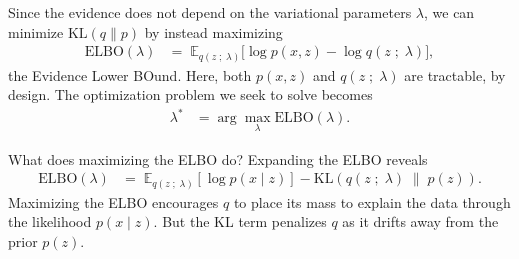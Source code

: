Since the evidence does not depend on the variational parameters $\lambda$,
we can minimize $\text{KL}(q\|p)$ by instead maximizing
\begin{align*}
  \text{ELBO}(\lambda)
  &=\;
  \mathbb{E}_{q(z\;;\;\lambda)}
  \big[
  \log p(x, z)
  -
  \log q(z\;;\;\lambda)
  \big],
\end{align*}
the Evidence Lower BOund. Here, both $p(x,z)$ and $q(z\;;\;\lambda)$ are
tractable, by design. The optimization problem we seek to solve becomes
\begin{align*}
  \lambda^*
  &=
  \arg \max_\lambda \text{ELBO}(\lambda).
\end{align*}

What does maximizing the ELBO do? Expanding the ELBO reveals
\begin{align*}
  \text{ELBO}(\lambda) 
  &=\;
  \mathbb{E}_{q(z \;;\; \lambda)}[\log p(x \mid z)]  
  - \text{KL}(q(z \;;\; \lambda) \;\|\; p(z)).
\end{align*}
Maximizing the ELBO encourages $q$ to place its mass to explain the data through
the likelihood $p(x \mid z)$. But the KL term penalizes $q$ as it drifts away
from the prior $p(z)$. 


